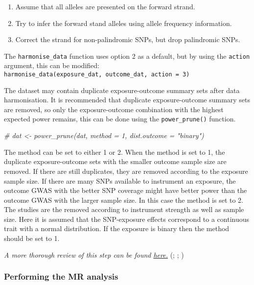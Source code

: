 \documentclass[
]{article}
\newenvironment{Shaded}{\begin{snugshade}}{\end{snugshade}}
\newcommand{\CommentTok}[1]{\textcolor[rgb]{0.56,0.35,0.01}{\textit{#1}}}
\providecommand{\tightlist}{%
  \setlength{\itemsep}{0pt}\setlength{\parskip}{0pt}}
\begin{document}
\begin{enumerate}
\def\labelenumi{\arabic{enumi}.}
\tightlist
\item
  Assume that all alleles are presented on the forward strand.
\item
  Try to infer the forward stand alleles using allele frequency
  information.
\item
  Correct the strand for non-palindromic SNPs, but drop palindromic
  SNPs.
\end{enumerate}

The \texttt{harmonise\_data} function uses option 2 as a default, but by
using the \texttt{action} argument, this can be modified:
\texttt{harmonise\_data(exposure\_dat,\ outcome\_dat,\ action\ =\ 3)}

The dataset may contain duplicate exposure-outcome summary sets after
data harmonisation. It is recommended that duplicate exposure-outcome
summary sets are removed, so only the exposure-outcome combination with
the highest expected power remains, this can be done using the
\texttt{power\_prune()} function.

\begin{Shaded}
\begin{Highlighting}[]
\CommentTok{\# dat \textless{}{-} power\_prune(dat, method = 1, dist.outcome = "binary")}
\end{Highlighting}
\end{Shaded}

The method can be set to either 1 or 2. When the method is set to 1, the
duplicate exposure-outcome sets with the smaller outcome sample size are
removed. If there are still duplicates, they are removed according to
the exposure sample size. If there are many SNPs available to instrument
an exposure, the outcome GWAS with the better SNP coverage might have
better power than the outcome GWAS with the larger sample size. In this
case the method is set to 2. The studies are the removed according to
instrument strength as well as sample size. Here it is assumed that the
SNP-exposure effects correspond to a continuous trait with a normal
distribution. If the exposure is binary then the method should be set to
1.

\emph{A more thorough review of this step can be found
\href{https://mrcieu.github.io/TwoSampleMR/articles/harmonise.html}{here.}}
(;
;
)

\subsubsection{Performing the MR
analysis}\label{performing-the-mr-analysis}
\end{document}
